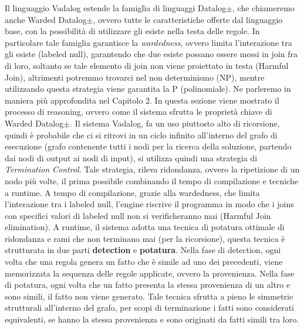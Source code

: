 Il linguaggio Vadalog estende la famiglia di linguaggi Datalog$\pm $, che chiameremo anche Warded Datalog$\pm $, ovvero tutte le caratteristiche offerte dal linguaggio base, con la possibilità di utilizzare gli esiste nella testa delle regole. \newline
In particolare tale famiglia garantisce la \textit{wardedness}, ovvero limita l'interazione tra gli esiste (labeled null), garantendo che due esiste possano essere messi in join fra di loro, soltanto se tale elemento di join non viene proiettato in testa (Harmful Join), altrimenti potremmo trovarci nel non determinismo (NP), mentre utilizzando questa strategia viene garantita la P  (polinomiale).\newline
Ne parleremo in maniera più approfondita nel Capitolo 2. \newline \newline
In questa sezione viene mostrato il processo di reasoning, ovvero come il sistema sfrutta le proprietà chiave di Warded Datalog$\pm$. \newline
Il sistema Vadalog, fa un uso piuttosto alto di ricorsione, quindi è probabile che ci si ritrovi in un ciclo infinito all'interno del grafo di esecuzione (grafo contenente tutti i nodi per la ricerca della soluzione, partendo dai nodi di output ai nodi di input), si utilizza quindi una strategia di \textit{Termination Control}. \newline
Tale strategia, rileva ridondanza, ovvero la ripetizione di un nodo più volte, il prima possibile combinando il tempo di compilazione e tecniche a runtime. \newline
A tempo di compilazione, grazie alla wardedness, che limita l'interazione tra i labeled null, l'engine riscrive il programma in modo che i joins con specifici valori di labeled null non si verificheranno mai (Harmful Join elimination). \newline
A runtime, il sistema adotta una tecnica di potatura ottimale di ridondanza e rami che non terminano mai (per la ricorsione), questa tecnica è strutturata in due parti \textbf{detection} e \textbf{potatura}. \newline
Nella fase di detection, ogni volta che una regola genera un fatto che è simile ad uno dei precedenti, viene memorizzata la sequenza delle regole applicate, ovvero la provenienza. \newline
Nella fase di potatura, ogni volta che un fatto presenta la stessa provenienza di un altro e sono simili, il fatto non viene generato. \newline
Tale tecnica sfrutta a pieno le simmetrie strutturali all'interno del grafo, per scopi di terminazione i fatti sono considerati equivalenti, se hanno la stessa provenienza e sono originati da fatti simili tra loro. \newline

